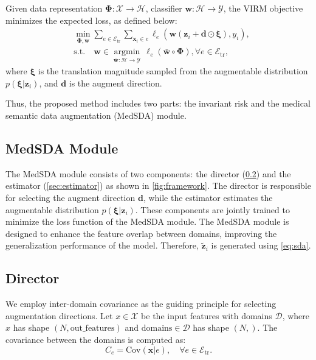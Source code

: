 \begin{definition}[VIRM]
	\label{def:virm}
	Given data representation $\mathbf{\Phi}: \mathcal{X} \rightarrow \mathcal{H}$, classifier $\mathbf{w}: \mathcal{H} \rightarrow \mathcal{Y}$, the VIRM objective minimizes the expected loss, as defined below:
	\begin{equation}
		\begin{aligned}
			&\min_{\mathbf{\Phi, \mathbf{w}}}
			\sum_{e \in  \mathcal{E}_{\mathrm{tr}}} \sum_{\mathbf{x}_i \in e} \ell_e(\mathbf{w} (\mathbf{z}_i + \mathbf{d} \odot \mathbf{\xi}), y_i), \\
			&\mathrm{s.t.} \quad \mathbf{w} \in \underset{\bar{\mathbf{w}}:\mathcal{H}\to\mathcal{Y}}{\operatorname*{\arg\min}} \, \ell_e(\bar{\mathbf{w}}\circ\mathbf{\Phi}),\forall e \in \mathcal{E}_{\mathrm{tr} },
		\end{aligned}
	\end{equation}
	where $\mathbf{\xi}$ is the translation magnitude sampled from the augmentable distribution $p(\mathbf{\xi} | \mathbf{z}_i)$, and $\mathbf{d}$ is the augment direction.
\end{definition}

Thus, the proposed method includes two parts: the invariant risk and the medical semantic data augmentation (MedSDA) module.

\subsection{MedSDA Module}
\label{sec:medsda}
The MedSDA module consists of two components: the director (\cref{sec:director}) and the estimator (\cref{sec:estimator}) as shown in \cref{fig:framework}. The director is responsible for selecting the augment direction $\mathbf{d}$, while the estimator estimates the augmentable distribution $p(\mathbf{\xi}|\mathbf{z}_i)$. These components are jointly trained to minimize the loss function of the MedSDA module. The MedSDA module is designed to enhance the feature overlap between domains, improving the generalization performance of the model. Therefore, $\tilde{\mathbf{z}}_i$ is generated using \cref{eq:sda}.

\subsection{Director}
\label{sec:director}
We employ inter-domain covariance as the guiding principle for selecting augmentation directions. Let $x \in \mathcal{X}$ be the input features with domains $\mathcal{D}$, where $x$ has shape $(N, \text{out\_features})$ and $\text{domains} \in \mathcal{D}$ has shape $(N,)$. The covariance between the domains is computed as:
\begin{equation}
	C_{e} = \text{Cov}(\mathbf{x} | e), \quad \forall e \in \mathcal{E}_{\mathrm{tr} }.
\end{equation}

